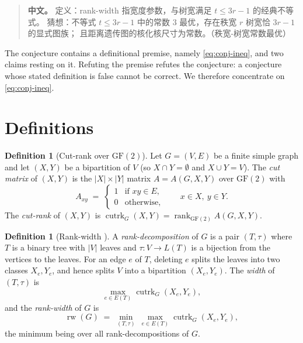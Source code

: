 \documentclass[11pt]{article}
\theoremstyle{definition}
\newtheorem{definition}[theorem]{Definition}
\theoremstyle{remark}
\newcommand{\rw}{\operatorname{rw}}
\DeclareMathOperator{\cutrk}{cutrk}
\DeclareMathOperator{\rank}{rank}
\begin{document}
\begin{quote}
\textbf{中文。} 定义：rank-width 指宽度参数，与树宽满足 $t \le 3r - 1$ 的经典不等式。
猜想：不等式 $t \le 3r - 1$ 中的常数 $3$ 最优，存在秩宽 $r$ 树宽恰 $3r - 1$ 的显式图族；
且距离遗传图的核化核尺寸为常数。（秩宽-树宽常数最优）
\end{quote}

The conjecture contains a definitional premise, namely \eqref{eq:conj-ineq}, and
two claims resting on it. Refuting the premise refutes the conjecture: a
conjecture whose stated definition is false cannot be correct. We therefore
concentrate on \eqref{eq:conj-ineq}.

\section{Definitions}

\begin{definition}[Cut-rank over $\mathrm{GF}(2)$]\label{def:cutrank}
Let $G = (V,E)$ be a finite simple graph and let $(X, Y)$ be a bipartition of
$V$ (so $X \cap Y = \emptyset$ and $X \cup Y = V$). The \emph{cut matrix} of
$(X,Y)$ is the $|X| \times |Y|$ matrix $A = A(G, X, Y)$ over
$\mathrm{GF}(2)$ with
\[
A_{xy} \;=\;
\begin{cases}
1 & \text{if } xy \in E,\\
0 & \text{otherwise,}
\end{cases}
\qquad x \in X,\ y \in Y .
\]
The \emph{cut-rank} of $(X,Y)$ is
$\cutrk_G(X,Y) = \rank_{\mathrm{GF}(2)} A(G,X,Y)$.
\end{definition}

\begin{definition}[Rank-width \cite{oum2005,oum2009}]\label{def:rw}
A \emph{rank-decomposition} of $G$ is a pair $(T,\tau)$ where $T$ is a binary
tree with $|V|$ leaves and $\tau \colon V \to L(T)$ is a bijection from the
vertices to the leaves. For an edge $e$ of $T$, deleting $e$ splits the leaves
into two classes $X_e, Y_e$, and hence splits $V$ into a bipartition $(X_e,
Y_e)$. The \emph{width} of $(T,\tau)$ is
\[
\max_{e \in E(T)} \cutrk_G(X_e, Y_e),
\]
and the \emph{rank-width} of $G$ is
\[
\rw(G) \;=\; \min_{(T,\tau)} \ \max_{e \in E(T)} \cutrk_G(X_e, Y_e),
\]
the minimum being over all rank-decompositions of $G$.
\end{definition}
\end{document}
